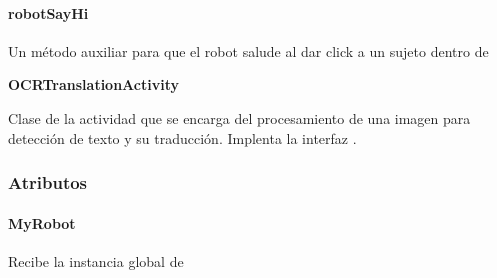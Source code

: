 \paragraph{robotSayHi}
\label{\detokenize{dev_docs:robotsayhi}}

\begin{fulllineitems}
\label{\detokenize{dev_docs:com.lar.cloudnao.FaceRecognitionActivity.robotSayHi(String)}}
Un método auxiliar para que el robot salude al dar click a un sujeto dentro de {\hyperref[\detokenize{dev_docs:com.lar.cloudnao.FaceRecognitionActivity.subjectRecognitionLV}]{}}

\end{fulllineitems}



\textbf{OCRTranslationActivity}
\label{\detokenize{dev_docs:ocrtranslationactivity}}

\begin{fulllineitems}
\label{\detokenize{dev_docs:com.lar.cloudnao.OCRTranslationActivity}}
Clase de la actividad que se encarga del procesamiento de una imagen para detección de texto y su traducción. Implenta la interfaz .

\end{fulllineitems}



\subsubsection{Atributos}
\label{\detokenize{dev_docs:id19}}

\paragraph{MyRobot}
\label{\detokenize{dev_docs:id20}}

\begin{fulllineitems}
\label{\detokenize{dev_docs:com.lar.cloudnao.OCRTranslationActivity.MyRobot}}
Recibe la instancia global de {\hyperref[\detokenize{dev_docs:com.lar.cloudnao.Robot}]{}}

\end{fulllineitems}



